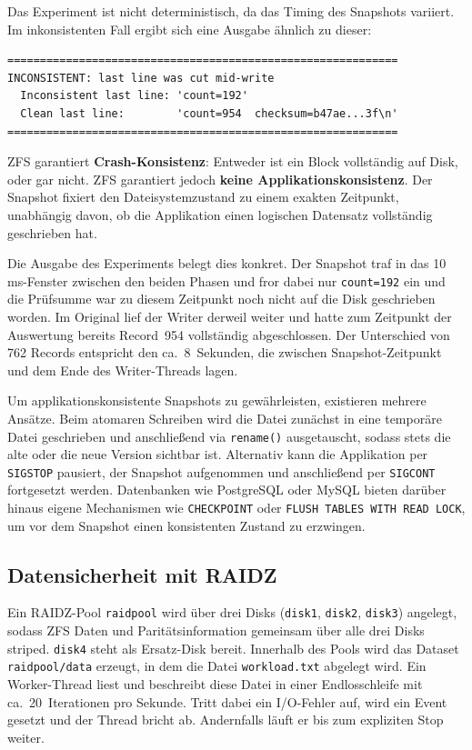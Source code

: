 \documentclass[a4paper, 12pt]{article}
\begin{document}
Das Experiment ist nicht deterministisch, da das Timing des Snapshots variiert. Im inkonsistenten Fall ergibt sich eine Ausgabe ähnlich zu dieser:

\begin{lstlisting}
============================================================
INCONSISTENT: last line was cut mid-write
  Inconsistent last line: 'count=192'
  Clean last line:        'count=954  checksum=b47ae...3f\n'
============================================================
\end{lstlisting}

ZFS garantiert \textbf{Crash-Konsistenz}: Entweder ist ein Block vollständig auf Disk, oder gar nicht. ZFS garantiert jedoch \textbf{keine Applikationskonsistenz}. Der Snapshot fixiert den Dateisystemzustand zu einem exakten Zeitpunkt, unabhängig davon, ob die Applikation einen logischen Datensatz vollständig geschrieben hat.

Die Ausgabe des Experiments belegt dies konkret. Der Snapshot traf in das 10\,ms-Fenster zwischen den beiden Phasen und fror dabei nur \texttt{count=192} ein und die Prüfsumme war zu diesem Zeitpunkt noch nicht auf die Disk geschrieben worden. Im Original lief der Writer derweil weiter und hatte zum Zeitpunkt der Auswertung bereits Record~954 vollständig abgeschlossen. Der Unterschied von 762 Records entspricht den ca.~8~Sekunden, die zwischen Snapshot-Zeitpunkt und dem Ende des Writer-Threads lagen.

Um applikationskonsistente Snapshots zu gewährleisten, existieren mehrere Ansätze. Beim atomaren Schreiben wird die Datei zunächst in eine temporäre Datei geschrieben und anschließend via \texttt{rename()} ausgetauscht, sodass stets die alte oder die neue Version sichtbar ist. Alternativ kann die Applikation per \texttt{SIGSTOP} pausiert, der Snapshot aufgenommen und anschließend per \texttt{SIGCONT} fortgesetzt werden. Datenbanken wie PostgreSQL oder MySQL bieten darüber hinaus eigene Mechanismen wie \texttt{CHECKPOINT} oder \texttt{FLUSH TABLES WITH READ LOCK}, um vor dem Snapshot einen konsistenten Zustand zu erzwingen.

\subsection{Datensicherheit mit RAIDZ}

Ein RAIDZ-Pool \texttt{raidpool} wird über drei Disks (\texttt{disk1}, \texttt{disk2}, \texttt{disk3}) angelegt, sodass ZFS Daten und Paritätsinformation gemeinsam über alle drei Disks striped. \texttt{disk4} steht als Ersatz-Disk bereit. Innerhalb des Pools wird das Dataset \texttt{raidpool/data} erzeugt, in dem die Datei \texttt{workload.txt} abgelegt wird. Ein Worker-Thread liest und beschreibt diese Datei in einer Endlosschleife mit ca.~20~Iterationen pro Sekunde. Tritt dabei ein I/O-Fehler auf, wird ein Event gesetzt und der Thread bricht ab. Andernfalls läuft er bis zum expliziten Stop weiter.
\end{document}
